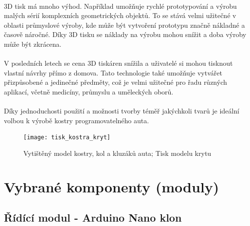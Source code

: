 \documentclass[12pt]{article}
\begin{document}
\begin{spacing}{1.5}
	\paragraph{} 3D tisk má mnoho výhod. Například umožňuje rychlé prototypování a výrobu malých sérií komplexních geometrických objektů. To se stává velmi užitečné v oblasti průmyslové výroby, kde může být vytvoření prototypu značně nákladné a časově náročné. Díky 3D tisku se náklady na výrobu mohou snížit a doba výroby může být zkrácena.
	
	\paragraph{} V posledních letech se cena 3D tiskáren snížila a uživatelé si mohou tisknout vlastní návrhy přímo z domova. Tato technologie také umožňuje vytvářet přizpůsobené a jedinečné předměty, což je velmi užitečné pro řadu různých aplikací, včetně medicíny, průmyslu a uměleckých oborů.
	
	\paragraph{} Díky jednoduchosti použití a možnosti tvorby téměř jakýchkoli tvarů je ideální volbou k výrobě kostry programovatelného auta.
	
	\begin{figure}[H]
		\centering
		\texttt{[image: tisk\_kostra\_kryt]}
		\caption{Vytištěný model kostry, kol a kluzáků auta; Tisk modelu krytu}
		\label{fig:tisk_kostra_kryt}
	\end{figure}

	\newpage
	\section{Vybrané komponenty (moduly)}
	\subsection{Řídící modul - Arduino Nano klon}

\end{spacing}
\end{document}
